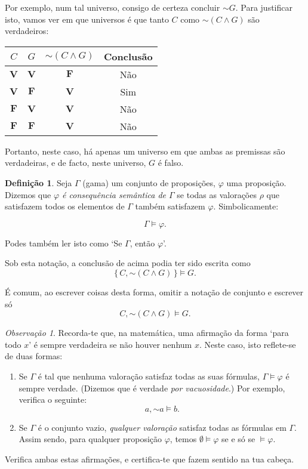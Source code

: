 \documentclass{article}
\theoremstyle{definition}
\newtheorem{definicao}{Definição}
\theoremstyle{remark}
\newtheorem{obs}{Observação}
\newcommand{\V}{\mathbf{V}}
\newcommand{\F}{\mathbf{F}}
\newcommand*{\lneg}{\mathord{\sim}}
\begin{document}
	Por exemplo, num tal universo, consigo de certeza concluir $\lneg G$. Para justificar isto, vamos ver em que universos é que tanto $C$ como $\lneg (C \land G)$ são verdadeiros:
	
	\begin{tabular}{|c|c|c|c|}
	\hline
	$C$ & $G$ & $\lneg(C \land G)$ & Conclusão \\
	\hline
	$\V$ & $\V$ & $\F$ & Não \\
	$\V$ & $\F$ & $\V$ & Sim \\
	$\F$ & $\V$ & $\V$ & Não \\
	$\F$ & $\F$ & $\V$ & Não \\
	\hline
	\end{tabular}
	\smallskip
	
	Portanto, neste caso, há apenas um universo em que ambas as premissas são verdadeiras, e de facto, neste universo, $G$ é falso.
	
	\begin{definicao}
	Seja $\Gamma$ (gama) um conjunto de proposições, $\varphi$ uma proposição. Dizemos que \emph{$\varphi$ é consequência semântica de $\Gamma$} se todas as valorações $\rho$ que satisfazem todos os elementos de $\Gamma$ também satisfazem $\varphi$. Simbolicamente:
	
	\[\Gamma \vDash \varphi.\]
	
	Podes também ler isto como `Se $\Gamma$, então $\varphi$'.
	\end{definicao}
	
	Sob esta notação, a conclusão de acima podia ter sido escrita como
	\[\{\, C, \lneg(C \land G) \,\} \vDash G.\]
	
	É comum, ao escrever coisas desta forma, omitir a notação de conjunto e escrever só
	\[C, \lneg(C \land G) \vDash G.\]
	
	\begin{obs}
	Recorda-te que, na matemática, uma afirmação da forma `para todo $x$' é sempre verdadeira se não houver nenhum $x$. Neste caso, isto reflete-se de duas formas:
	
	\begin{enumerate}
	\item Se $\Gamma$ é tal que nenhuma valoração satisfaz todas as suas fórmulas, $\Gamma \vDash \varphi$ é sempre verdade. (Dizemos que é verdade \emph{por vacuosidade}.) Por exemplo, verifica o seguinte:
	\[ a, \lneg a \vDash b.\]
	
	\item Se $\Gamma$ é o conjunto vazio, \emph{qualquer valoração} satisfaz todas as fórmulas em $\Gamma$. Assim sendo, para qualquer proposição $\varphi$, temos $\emptyset \vDash \varphi$ se e só se $\vDash \varphi$.
	\end{enumerate}
	
	Verifica ambas estas afirmações, e certifica-te que fazem sentido na tua cabeça.
	\end{obs}
	
\end{document}
